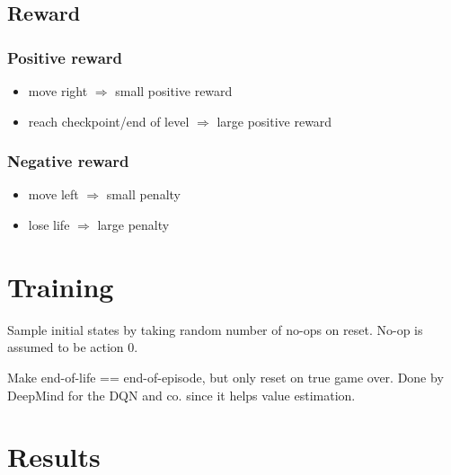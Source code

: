 \documentclass{article}
\begin{document}
    \subsection{Reward}
    \subsubsection*{Positive reward}
    \begin{itemize}
        \item move right $\Rightarrow$ small positive reward
        \item reach checkpoint/end of level $\Rightarrow$ large positive reward
    \end{itemize}
    \subsubsection*{Negative reward}
    \begin{itemize}
        \item move left $\Rightarrow$ small penalty
        \item lose life $\Rightarrow$ large penalty
    \end{itemize}

    \section{Training}
    Sample initial states by taking random number of no-ops on reset.
    No-op is assumed to be action 0.

    Make end-of-life == end-of-episode, but only reset on true game over.
    Done by DeepMind for the DQN and co. since it helps value estimation.

    \section{Results}
\end{document}
